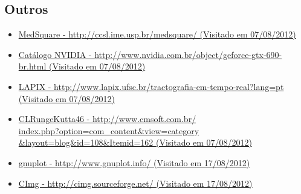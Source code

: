\subsection{Outros}
\begin{itemize}
  \item \label{medsquare}\href{http://ccsl.ime.usp.br/medsquare/}{MedSquare - http://ccsl.ime.usp.br/medsquare/ (Visitado em 07/08/2012)}
  \item \label{gtx690}\href{http://www.nvidia.com.br/object/geforce-gtx-690-br.html}{Catálogo NVIDIA - http://www.nvidia.com.br/object/geforce-gtx-690-br.html (Visitado em 07/08/2012)}
  \item \label{lapix}\href{http://www.lapix.ufsc.br/tractografia-em-tempo-real?lang=pt}{LAPIX - http://www.lapix.ufsc.br/tractografia-em-tempo-real?lang=pt (Visitado em 07/08/2012)}
  \item \label{CLRungeKutta46}\href{http://www.cmsoft.com.br/index.php?option=com\_content\&view=category\&layout=blog\&id=108\&Itemid=162}{CLRungeKutta46 - http://www.cmsoft.com.br/\\index.php?option=com\_content\&view=category\\ \&layout=blog\&id=108\&Itemid=162 (Visitado em 07/08/2012)}
  \item \label{gnuplot}\href{http://www.gnuplot.info/}{gnuplot - http://www.gnuplot.info/ (Visitado em 17/08/2012)}
  \item \label{CImg}\href{http://cimg.sourceforge.net/}{CImg - http://cimg.sourceforge.net/ (Visitado em 17/08/2012)}
\end{itemize}
